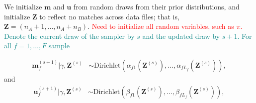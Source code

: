 \documentclass[ba]{imsart}
\begin{document}
We initialize $\bm{m}$ and $\bm{u}$ from random draws from their prior distributions, and initialize $\bm{Z}$ to reflect no matches across data files; that is, $\bm{Z} = (n_A + 1, \ldots, n_A + n_B)$. \textcolor{red}{Need to initialize all random variables, such as $\pi$.} \textcolor{teal}{Denote the current draw of the sampler by $s$ and the updated draw by $s+1$.} \textcolor{teal}{For all $f=1, \ldots, F$ sample}



%

\begin{align}
	\bm{m}_f^{(s+1)}|\gamma, \bm{Z}^{(s)} &\sim \text{Dirichlet}(\alpha_{f1}(\bm{Z}^{(s)}), \ldots, \alpha_{fL_f}(\bm{Z}^{(s)})), \label{eqn:m_update}  
\end{align}
and	
\begin{align}
	\bm{u}_f^{(s+1)}|\gamma, \bm{Z}^{(s)} &\sim \text{Dirichlet}(\beta_{f1}(\bm{Z}^{(s)}), \ldots, \beta_{fL_f}(\bm{Z}^{(s)})), \label{eqn:u_update} 
\end{align}	
\end{document}

